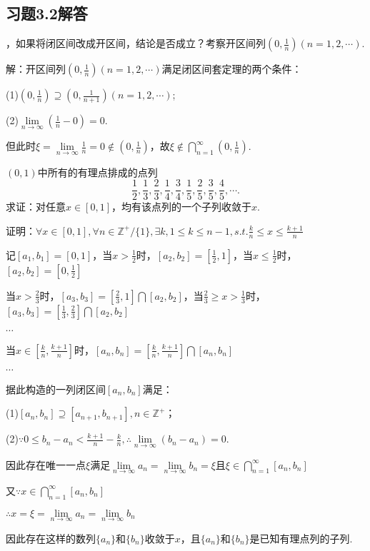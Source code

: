 \documentclass[12pt,UTF8]{ctexart}
\begin{document}
\subsection{习题3.2解答}
\begin{enumerate}
，如果将闭区间改成开区间，结论是否成立？考察开区间列$(0,\frac1n)(n=1,2,\cdots)$.

解：开区间列$(0,\frac1n)(n=1,2,\cdots)$满足闭区间套定理的两个条件：

(1)$(0,\frac1n)\supseteq(0,\frac1{n+1})(n=1,2,\cdots)$;

(2)$\lim\limits_{n\rightarrow\infty}(\frac1n-0)=0$.

但此时$\xi=\lim\limits_{n\rightarrow\infty}\frac1n=0\notin(0,\frac1n)$，故$\xi\notin\bigcap\limits_{n=1}^{\infty}(0,\frac1n)$.

$(0,1)$中所有的有理点排成的点列
\[
\frac12,\frac13,\frac23,\frac14,\frac34,\frac15,\frac25,\frac35,\frac45,\cdots.
\]
求证：对任意$x\in[0,1]$，均有该点列的一个子列收敛于$x$.

证明：$\forall x\in[0,1],\forall n\in\mathbb Z^+/\{1\},\exists k,1\leq k\leq n-1,s.t.\frac kn\leq x\leq\frac{k+1}n$

记$[a_1,b_1]=[0,1]$，当$x>\frac12$时，$[a_2,b_2]=[\frac12,1]$，当$x
\leq\frac12$时，$[a_2,b_2]=[0,\frac12]$

当$x>\frac23$时，$[a_3,b_3]=[\frac23,1]\bigcap[a_2,b_2]$，当$\frac23\geq x>\frac13$时，$[a_3,b_3]=[\frac13,\frac23]\bigcap[a_2,b_2]$

$\cdots$

当$x\in[\frac kn,\frac{k+1}n]$时，$[a_n,b_n]=[\frac kn,\frac{k+1}n]\bigcap[a_n,b_n]$

$\cdots$

据此构造的一列闭区间$[a_n,b_n]$满足：

(1)$[a_n,b_n]\supseteq[a_{n+1},b_{n+1}],n\in\mathbb Z^+$；

(2)$\because0\leq b_n-a_n<\frac{k+1}n-\frac kn,\therefore\lim\limits_{n\rightarrow\infty}(b_n-a_n)=0$.

因此存在唯一一点$\xi$满足$\lim\limits_{n\rightarrow\infty}a_n=\lim\limits_{n\rightarrow\infty}b_n=\xi$且$\xi\in\bigcap\limits_{n=1}^\infty[a_n,b_n]$

又$\because x\in\bigcap\limits_{n=1}^\infty[a_n,b_n]$

$\therefore x=\xi=\lim\limits_{n\rightarrow\infty}a_n=\lim\limits_{n\rightarrow\infty}b_n$

因此存在这样的数列$\{a_n\}$和$\{b_n\}$收敛于$x$，且$\{a_n\}$和$\{b_n\}$是已知有理点列的子列.


\end{enumerate}
\end{document}
